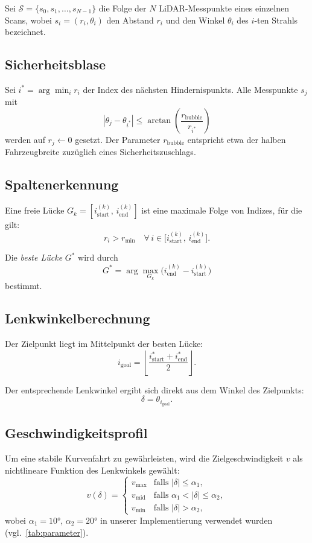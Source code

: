 Sei \(\mathcal{S} = \{s_0, s_1, \ldots, s_{N-1}\}\) die Folge der
\(N\) LiDAR-Messpunkte eines einzelnen Scans, wobei
\(s_i = (r_i, \theta_i)\) den Abstand \(r_i\) und den Winkel
\(\theta_i\) des \(i\)-ten Strahls bezeichnet.

\subsection{Sicherheitsblase}
\label{subsec:bubble}

Sei \(i^* = \arg\min_i r_i\) der Index des nächsten Hindernispunkts.
Alle Messpunkte \(s_j\) mit
\[
  \left| \theta_j - \theta_{i^*} \right| \leq
  \arctan\!\left(\frac{r_{\text{bubble}}}{r_{i^*}}\right)
\]
werden auf \(r_j \leftarrow 0\) gesetzt.
Der Parameter \(r_{\text{bubble}}\) entspricht etwa der halben
Fahrzeugbreite zuzüglich eines Sicherheitszuschlags.

\subsection{Spaltenerkennung}
\label{subsec:gaps}

Eine freie Lücke \(G_k = [i_{\text{start}}^{(k)},\,
i_{\text{end}}^{(k)}]\) ist eine maximale Folge von Indizes, für
die gilt:
\[
  r_i > r_{\min}
  \quad \forall\, i \in
  \bigl[i_{\text{start}}^{(k)},\, i_{\text{end}}^{(k)}\bigr].
\]

Die \emph{beste Lücke} \(G^*\) wird durch
\[
  G^* = \arg\max_{G_k}
  \bigl(i_{\text{end}}^{(k)} - i_{\text{start}}^{(k)}\bigr)
\]
bestimmt.

\subsection{Lenkwinkelberechnung}
\label{subsec:steering}

Der Zielpunkt liegt im Mittelpunkt der besten Lücke:
\[
  i_{\text{goal}} =
  \left\lfloor
    \frac{i_{\text{start}}^* + i_{\text{end}}^*}{2}
  \right\rfloor.
\]

Der entsprechende Lenkwinkel ergibt sich direkt aus dem Winkel
des Zielpunkts:
\[
  \delta = \theta_{i_{\text{goal}}}.
\]

\subsection{Geschwindigkeitsprofil}
\label{subsec:velocity}

Um eine stabile Kurvenfahrt zu gewährleisten, wird die Zielgeschwindigkeit
\(v\) als nichtlineare Funktion des Lenkwinkels gewählt:
\[
  v(\delta) =
  \begin{cases}
    v_{\max}          & \text{falls } |\delta| \leq \alpha_1, \\
    v_{\text{mid}}    & \text{falls } \alpha_1 < |\delta| \leq \alpha_2, \\
    v_{\min}          & \text{falls } |\delta| > \alpha_2,
  \end{cases}
\]
wobei \(\alpha_1 = 10°\), \(\alpha_2 = 20°\) in unserer Implementierung
verwendet wurden (vgl.\ \cref{tab:parameter}).


